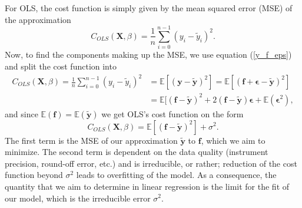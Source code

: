 \documentclass[]{article}
\begin{document}
For OLS, the cost function is simply given by the mean squared error (MSE) of the approximation
\begin{equation}
\label{cost-ols}
	C_{OLS}(\mathbf{X},\mathbb{\beta}) = \frac{1}{n} \sum_{i=0}^{n-1} (y_i - \tilde{y}_i)^2.
\end{equation}
Now, to find the components making up the MSE, we use equation (\ref{y_f_eps}) and split the cost function into
\begin{equation*}
\begin{aligned}
	C_{OLS}(\mathbf{X},\mathbb{\beta}) = \frac{1}{n} \sum_{i=0}^{n-1} (y_i - \tilde{y}_i)^2 &= \mathbb{E}[(\mathbf{y} - \mathbf{\tilde{y}})^2] = \mathbb{E}[(\mathbf{f} + \mathbf{\epsilon} - \mathbf{\tilde{y}})^2] \\
	&= \mathbb{E}[(\mathbf{f} - \mathbf{\tilde{y}})^2 + 2(\mathbf{f} - \mathbf{\tilde{y}})\mathbf{\epsilon} + \mathbb{E}(\mathbf{\epsilon}^2),
\end{aligned}
\end{equation*}
and since $\mathbb{E}(\mathbf{f}) = \mathbb{E}(\mathbf{\tilde{y}})$ we get OLS's cost function on the form \cite{james2013introduction}
\begin{equation}
\label{red-irred}
	C_{OLS}(\mathbf{X},\mathbb{\beta}) = \mathbb{E}[(\mathbf{f} - \mathbf{\tilde{y}})^2] + \sigma^2.
\end{equation}
The first term is the MSE of our approximation $\mathbf{\tilde{y}}$ to $\mathbf{f}$, which we aim to minimize. The second term is dependent on the data quality (instrument precision, round-off error, etc.) and is irreducible, or rather; reduction of the cost function beyond $\sigma^2$ leads to overfitting of the model. As a consequence, the quantity that we aim to determine in linear regression is the limit for the fit of our model, which is the irreducible error $\sigma^2$.
\end{document}
